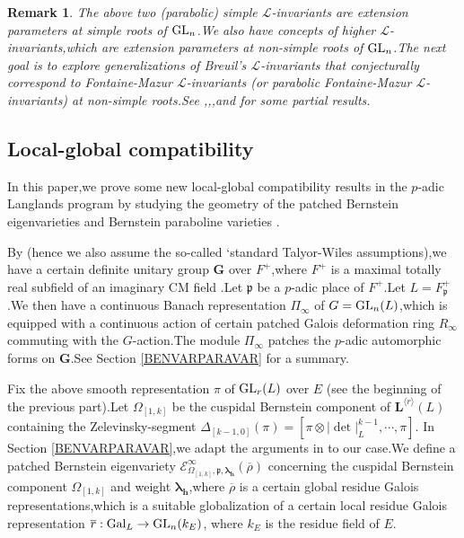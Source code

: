 \documentclass[SecEq,CM,GP]{degruyter-crelle} %
\theoremstyle{plain}
\newtheorem{rmk}[thm]{Remark}
\newcommand{\bersteineigenvarpik}{{\mathcal{E}_{\omepik,\fp,\bm{\lambda}_\bh}^\infty(\overline{\rho})}}
\newcommand{\gal}{{\rm Gal}}
\newcommand{\GLN}{{\rm GL}}
\newcommand{\lrr}{{\langle r\rangle}}
\newcommand{\omepik}{\Omega_{[1,k]}}
\newcommand{\bG}{{\mathbf{G}}}
\newcommand{\bL}{{\mathbf{L}}}
\newcommand{\bh}{{\mathbf{h}}}
\newcommand{\fp}{{\mathfrak{p}}}
\newcommand{\sL}{\mathcal L}
\begin{document}
\begin{rmk}
	The above two (parabolic) simple $\sL$-invariants are extension parameters at simple roots of $\GLN_n$.\;We also have concepts of higher $\sL$-invariants,\;which are  extension parameters at non-simple roots of $\GLN_n$.\;The next goal is to explore generalizations of Breuil's  $\sL$-invariants that conjecturally correspond to Fontaine-Mazur $\sL$-invariants (or parabolic Fontaine-Mazur $\sL$-invariants) at non-simple roots.\;See \cite{schraen2011GL3},\;\cite{HigherLinvariantsGL3Qp},\;\cite{breuil2019ext1},\;and \cite{Dilogarithm} for some partial results.\;
\end{rmk}








\subsection*{Local-global compatibility}
In this paper,\;we prove some new local-global compatibility results in the $p$-adic Langlands program by studying the geometry of the patched Bernstein eigenvarieties and Bernstein paraboline varieties \cite{Ding2021}.\;

By \cite{PATCHING2016} (hence we also assume the so-called `standard Talyor-Wiles assumptions),\;we have a certain definite unitary group $\bG$ over $F^+$,\;where $F^+$ is a maximal totally real subfield of an imaginary CM field .\;Let $\fp$ be a $p$-adic place of $F^+$.\;Let $L=F^+_\fp$.\;We then have a continuous Banach representation $\Pi_\infty$ of $G=\GLN_{n}(L)$,\;which is equipped with a continuous action of certain patched Galois deformation ring $R_\infty$ commuting with the  $G$-action.\;The module $\Pi_\infty$ patches the $p$-adic automorphic forms on  $\bG$.\;See Section \ref{BENVARPARAVAR} for a summary.\;

Fix the above smooth representation $\pi$ of $\GLN_r(L)$ over $E$ (see the beginning of the previous part).\;Let $\omepik$ be the cuspidal Bernstein component of $\bL^{\lrr}(L)$ containing the Zelevinsky-segment $\Delta_{[k-1,0]}(\pi)=[\pi\otimes |\det|_L^{k-1},\cdots,\pi]$. In Section \ref{BENVARPARAVAR},\;we adapt
the arguments in \cite[Section 3.3,\;Section 4.2]{Ding2021} to our case.\;We define a patched Bernstein eigenvariety $\bersteineigenvarpik$ concerning the cuspidal Bernstein component $\omepik$ and weight ${\bm\lambda}_\bh$,\;where $\overline{\rho}$ is a certain global residue Galois representations,\;which is a suitable globalization of a certain local residue Galois representation $\overline{r}:\gal_L\rightarrow \GLN_{n}(k_E)$, where $k_E$ is the residue field of $E$.\;
\end{document}
